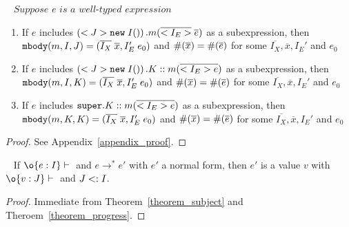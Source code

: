 \begin{theorem}[Progress]~\label{theorem_progress}
$\textit{Suppose } e \textit{ is a well-typed expression } $ \\
\begin{enumerate}
\item If $e$ includes $\left(<J>\texttt{new} \; I()\right).m(\overline{<I_E>} \; \overline{e})$ as a subexpression,
    then $ \texttt{mbody}(m, I, J) = (\overline{I_X} \; \overline{x}, I'_E \; e_0) $ and
         $\#(\overline{x}) = \#(\overline{e})$ for some $\overline{I_X}, \overline{x}, I_E'$ and $e_0$
\item If $e$ includes $\left(<J>\texttt{new} \; I()\right).K::m(\overline{<I_E> e})$ as a subexpression,
    then $ \texttt{mbody}(m, I, K) = (\overline{I_X} \; \overline{x}, I'_E \; e_0) $ and 
         $\#(\overline{x}) = \#(\overline{e})$ for some $\overline{I_X}, \overline{x}, I_E'$ and $e_0$
\item If $e$ includes $\texttt{super}.K::m(\overline{<I_E> e})$ as a subexpression,
    then $ \texttt{mbody}(m, K, K) = (\overline{I_X} \; \overline{x}, I'_E \; e_0) $ and 
         $\#(\overline{x}) = \#(\overline{e})$ for some $\overline{I_X}, \overline{x}, I_E'$ and $e_0$
\end{enumerate}
\end{theorem}
\begin{proof}
See Appendix~\ref{appendix_proof}.
\end{proof}

\begin{theorem}~\label{theorem_soundness}
If $\judgeewf \o {e : I}$ and $e \to^* e'$ with $e'$ a normal form, then $e'$ is 
a value $v$ with $\judgeewf \o {v:J}$ and $J <: I$.
\end{theorem}
\begin{proof}
Immediate from Theorem~\ref{theorem_subject} and Theroem~\ref{theorem_progress}.
\end{proof}